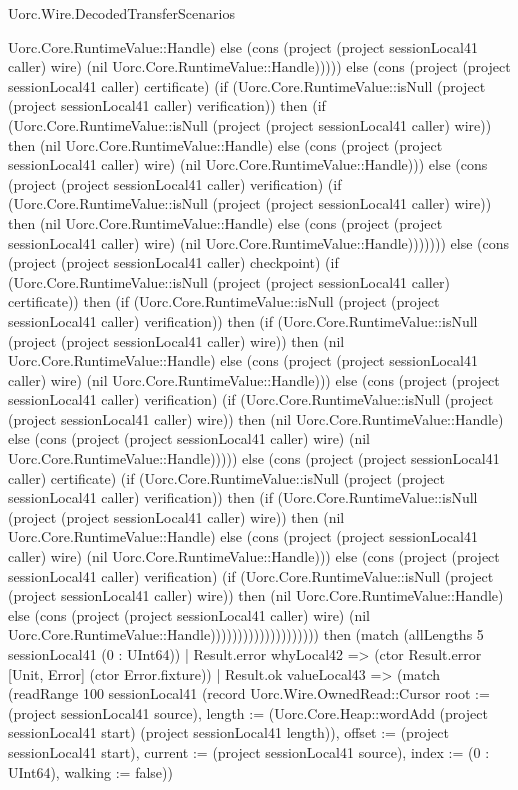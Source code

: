 \begin{lexlean}{Uorc.Wire.DecodedTransferScenarios}
\begin{semanticmodule}
{Uorc.Core.RuntimeValue::Handle) else (cons (project (project sessionLocal41 caller) wire) (nil Uorc.Core.RuntimeValue::Handle))))) else (cons (project (project sessionLocal41 caller) certificate) (if (Uorc.Core.RuntimeValue::isNull (project (project sessionLocal41 caller) verification)) then (if (Uorc.Core.RuntimeValue::isNull (project (project sessionLocal41 caller) wire)) then (nil Uorc.Core.RuntimeValue::Handle) else (cons (project (project sessionLocal41 caller) wire) (nil Uorc.Core.RuntimeValue::Handle))) else (cons (project (project sessionLocal41 caller) verification) (if (Uorc.Core.RuntimeValue::isNull (project (project sessionLocal41 caller) wire)) then (nil Uorc.Core.RuntimeValue::Handle) else (cons (project (project sessionLocal41 caller) wire) (nil Uorc.Core.RuntimeValue::Handle))))))) else (cons (project (project sessionLocal41 caller) checkpoint) (if (Uorc.Core.RuntimeValue::isNull (project (project sessionLocal41 caller) certificate)) then (if (Uorc.Core.RuntimeValue::isNull (project (project sessionLocal41 caller) verification)) then (if (Uorc.Core.RuntimeValue::isNull (project (project sessionLocal41 caller) wire)) then (nil Uorc.Core.RuntimeValue::Handle) else (cons (project (project sessionLocal41 caller) wire) (nil Uorc.Core.RuntimeValue::Handle))) else (cons (project (project sessionLocal41 caller) verification) (if (Uorc.Core.RuntimeValue::isNull (project (project sessionLocal41 caller) wire)) then (nil Uorc.Core.RuntimeValue::Handle) else (cons (project (project sessionLocal41 caller) wire) (nil Uorc.Core.RuntimeValue::Handle))))) else (cons (project (project sessionLocal41 caller) certificate) (if (Uorc.Core.RuntimeValue::isNull (project (project sessionLocal41 caller) verification)) then (if (Uorc.Core.RuntimeValue::isNull (project (project sessionLocal41 caller) wire)) then (nil Uorc.Core.RuntimeValue::Handle) else (cons (project (project sessionLocal41 caller) wire) (nil Uorc.Core.RuntimeValue::Handle))) else (cons (project (project sessionLocal41 caller) verification) (if (Uorc.Core.RuntimeValue::isNull (project (project sessionLocal41 caller) wire)) then (nil Uorc.Core.RuntimeValue::Handle) else (cons (project (project sessionLocal41 caller) wire) (nil Uorc.Core.RuntimeValue::Handle)))))))))))))))))))) then (match (allLengths 5 sessionLocal41 (0 : UInt64))
          | Result.error whyLocal42 => (ctor Result.error [Unit, Error] (ctor Error.fixture))
          | Result.ok valueLocal43 => (match (readRange 100 sessionLocal41 (record Uorc.Wire.OwnedRead::Cursor {root := (project sessionLocal41 source), length := (Uorc.Core.Heap::wordAdd (project sessionLocal41 start) (project sessionLocal41 length)), offset := (project sessionLocal41 start), current := (project sessionLocal41 source), index := (0 : UInt64), walking := false}))
}
\end{semanticmodule}
\end{lexlean}

